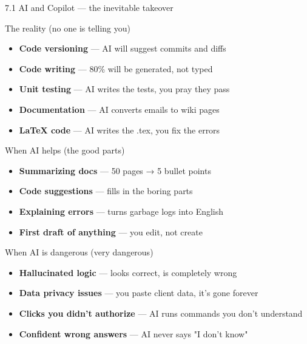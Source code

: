 \documentclass[aspectratio=169, 11pt]{beamer}
\begin{document}
\begin{frame}{7.1 AI and Copilot — the inevitable takeover}
	\begin{block}{The reality (no one is telling you)}
		\tiny
		\begin{itemize}
			\item \textbf{Code versioning} — AI will suggest commits and diffs
			\item \textbf{Code writing} — 80\% will be generated, not typed
			\item \textbf{Unit testing} — AI writes the tests, you pray they pass
			\item \textbf{Documentation} — AI converts emails to wiki pages
			\item \textbf{LaTeX code} — AI writes the .tex, you fix the errors
		\end{itemize}
	\end{block}
	
	\vspace{0.03cm}
	
	\begin{block}{When AI helps (the good parts)}
		\tiny
		\begin{itemize}
			\item \textbf{Summarizing docs} — 50 pages → 5 bullet points
			\item \textbf{Code suggestions} — fills in the boring parts
			\item \textbf{Explaining errors} — turns garbage logs into English
			\item \textbf{First draft of anything} — you edit, not create
		\end{itemize}
	\end{block}
	
	\vspace{0.03cm}
	
	\begin{block}{When AI is dangerous (very dangerous)}
		\tiny
		\begin{itemize}
			\item \textbf{Hallucinated logic} — looks correct, is completely wrong
			\item \textbf{Data privacy issues} — you paste client data, it's gone forever
			\item \textbf{Clicks you didn't authorize} — AI runs commands you don't understand
			\item \textbf{Confident wrong answers} — AI never says "I don't know"
		\end{itemize}
	\end{block}
	

\end{frame}
\end{document}
